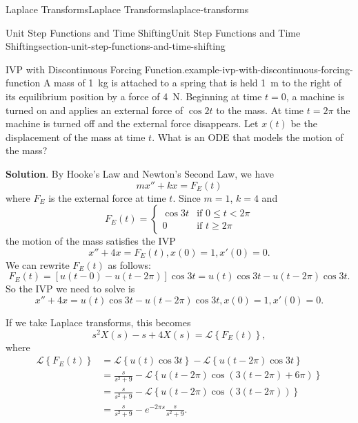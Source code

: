\documentclass[oneside,10pt,]{book}
\numberwithin{equation}{section}
\newcommand{\Laplace}[1]{\mathcal{L}\left\{#1\right\}}
\newcommand{\lt}{<}
\newcommand{\amp}{&}
\begin{document}
\begin{chapterptx}{Laplace Transforms}{}{Laplace Transforms}{}{}{laplace-transforms}
\begin{sectionptx}{Unit Step Functions and Time Shifting}{}{Unit Step Functions and Time Shifting}{}{}{section-unit-step-functions-and-time-shifting}
\begin{example}{IVP with Discontinuous Forcing Function.}{example-ivp-with-discontinuous-forcing-function}
\hypertarget{p-526}{}%
A mass of \SI{1}{\kilogram} is attached to a spring that is held \SI{1}{\meter} to the right of its equilibrium position by a force of \SI{4}{\newton}. Beginning at time \(t=0\), a machine is turned on and applies an external force of \(\cos2t\) to the mass. At time \(t=2\pi\) the machine is turned off and the external force disappears. Let \(x(t)\) be the displacement of the mass at time \(t\). What is an ODE that models the motion of the mass?%
\par\smallskip%
\noindent\textbf{Solution}.\hypertarget{solution-85}{}\quad%
\hypertarget{p-527}{}%
By Hooke's Law and Newton's Second Law, we have%
\begin{equation*}
mx''+kx = F_{E}(t)
\end{equation*}
where \(F_{E}\) is the external force at time \(t\). Since \(m = 1\), \(k = 4\) and%
\begin{equation*}
F_{E}(t) = 
\begin{cases}
\cos3t \amp\text{if }0\leq t\lt 2\pi\\
0 \amp\text{if }t\geq2\pi  
\end{cases}
\end{equation*}
the motion of the mass satisfies the IVP%
\begin{equation*}
x''+4x = F_{E}(t), x(0) = 1, x'(0) = 0.
\end{equation*}
We can rewrite \(F_{E}(t)\) as follows:%
\begin{equation*}
F_{E}(t) = [u(t-0)-u(t-2\pi)]\cos3t = u(t)\cos3t - u(t-2\pi)\cos3t.
\end{equation*}
So the IVP we need to solve is%
\begin{equation*}
x''+4x = u(t)\cos3t - u(t-2\pi)\cos3t, x(0) = 1, x'(0) = 0.
\end{equation*}
%
\par
\hypertarget{p-528}{}%
If we take Laplace transforms, this becomes%
\begin{equation*}
s^{2}X(s) - s + 4X(s) = \Laplace{F_{E}(t)},
\end{equation*}
where%
\begin{align*}
\Laplace{F_{E}(t)} \amp= \Laplace{u(t)\cos3t} - \Laplace{u(t-2\pi)\cos3t}\\
\amp= \frac{s}{s^{2}+9} - \Laplace{u(t-2\pi)\cos(3(t-2\pi)+6\pi)}\\
\amp= \frac{s}{s^{2}+9} - \Laplace{u(t-2\pi)\cos(3(t-2\pi))}\\
\amp= \frac{s}{s^{2}+9} - e^{-2\pi s}\frac{s}{s^{2}+9}\text{.}
\end{align*}

\end{example}
\end{sectionptx}
\end{chapterptx}
\end{document}

